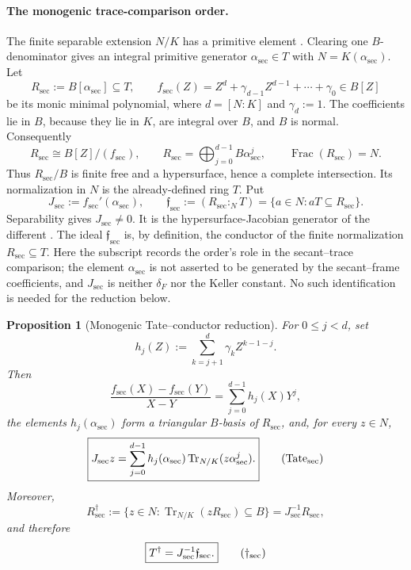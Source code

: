 \documentclass[11pt]{article}
\newtheorem{proposition}[theorem]{Proposition}
\theoremstyle{remark}
\theoremstyle{definition}
\DeclareMathOperator{\Frac}{Frac}
\begin{document}
\paragraph{The monogenic trace-comparison order.}
The finite separable extension \(N/K\) has a primitive element
\cite{StacksPrimitiveElement}.  Clearing one
\(B\)-denominator gives an integral primitive generator
\(\alpha_{\mathrm{sec}}\in T\) with
\(N=K(\alpha_{\mathrm{sec}})\).  Let
\[
  R_{\mathrm{sec}}:=B[\alpha_{\mathrm{sec}}]\subseteq T,
  \qquad
  f_{\mathrm{sec}}(Z)
  =Z^d+\gamma_{d-1}Z^{d-1}+\cdots+\gamma_0\in B[Z]
\]
be its monic minimal polynomial, where \(d=[N:K]\) and
\(\gamma_d:=1\).  The coefficients lie in \(B\), because they lie in
\(K\), are integral over \(B\), and \(B\) is normal.  Consequently
\[
  R_{\mathrm{sec}}\cong B[Z]/(f_{\mathrm{sec}}),
  \qquad
  R_{\mathrm{sec}}
  =\bigoplus_{j=0}^{d-1}B\alpha_{\mathrm{sec}}^j,
  \qquad
  \Frac(R_{\mathrm{sec}})=N.
\]
Thus \(R_{\mathrm{sec}}/B\) is finite free and a hypersurface, hence a
complete intersection.  Its normalization in \(N\) is the already-defined
ring \(T\).  Put
\[
  J_{\mathrm{sec}}
  :=f_{\mathrm{sec}}'(\alpha_{\mathrm{sec}}),
  \qquad
  \mathfrak f_{\mathrm{sec}}
  :=(R_{\mathrm{sec}}:_N T)
  =\{a\in N:aT\subseteq R_{\mathrm{sec}}\}.
\]
Separability gives \(J_{\mathrm{sec}}\neq0\).  It is the
hypersurface-Jacobian generator of the different
\cite{StacksHypersurfaceDifferent}.  The ideal
\(\mathfrak f_{\mathrm{sec}}\) is, by definition, the conductor of the
finite normalization \(R_{\mathrm{sec}}\subseteq T\).
Here the subscript records the order's role in the secant--trace comparison;
the element \(\alpha_{\mathrm{sec}}\) is not asserted to be generated by
the secant--frame coefficients, and \(J_{\mathrm{sec}}\) is neither
\(\delta_F\) nor the Keller constant.  No such identification is needed for
the reduction below.

\begin{proposition}[Monogenic Tate--conductor reduction]
\label{prop:monogenic-tate-conductor-reduction}
For \(0\leq j<d\), set
\[
  h_j(Z):=\sum_{k=j+1}^{d}\gamma_kZ^{k-1-j}.
\]
Then
\[
  \frac{f_{\mathrm{sec}}(X)-f_{\mathrm{sec}}(Y)}{X-Y}
  =\sum_{j=0}^{d-1}h_j(X)Y^j,
\]
the elements \(h_j(\alpha_{\mathrm{sec}})\) form a triangular
\(B\)-basis of \(R_{\mathrm{sec}}\),
and, for every \(z\in N\),
\[
  \boxed{
  J_{\mathrm{sec}}z
  =\sum_{j=0}^{d-1}
    h_j(\alpha_{\mathrm{sec}})
    \operatorname{Tr}_{N/K}
      (z\alpha_{\mathrm{sec}}^j).}
  \tag{\(\mathrm{Tate}_{\mathrm{sec}}\)}
\]
Moreover,
\[
  R_{\mathrm{sec}}^\dagger
  :=\{z\in N:
      \operatorname{Tr}_{N/K}(zR_{\mathrm{sec}})\subseteq B\}
  =J_{\mathrm{sec}}^{-1}R_{\mathrm{sec}},
\]
and therefore
\[
  \boxed{
  T^\dagger
  =J_{\mathrm{sec}}^{-1}\mathfrak f_{\mathrm{sec}}.}
  \tag{\(\dagger_{\mathrm{sec}}\)}
\]
\end{proposition}
\end{document}
